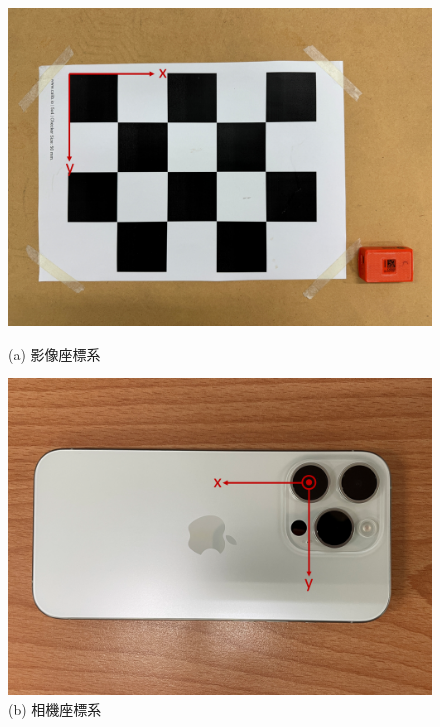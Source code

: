 \begin{figure}[!ht]
   \centering
   \begin{minipage}{.5\textwidth}
      \centering
      \includegraphics[width=.95\linewidth]{figure/ch3_fig_imgframe.png}
      \caption*{(a) 影像座標系}
   \end{minipage}%
   \vspace{5mm}%
   \begin{minipage}{.5\textwidth}
      \centering
      \includegraphics[width=.95\linewidth]{figure/ch3_fig_camframe.png}
      \caption*{(b) 相機座標系}
   \end{minipage}
   \begin{minipage}{.5\textwidth}
     \centering

\end{minipage}
\end{figure}
